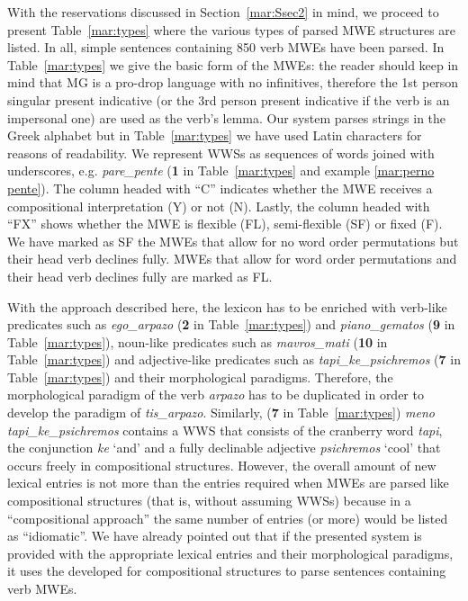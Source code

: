 \documentclass[output=paper]{langsci/langscibook}
\begin{document}
With the reservations discussed in Section~\ref{mar:Ssec2} in mind, we proceed to present Table~\ref{mar:types} where the various types of parsed MWE structures are listed. In all, simple sentences containing 850 verb MWEs have been parsed. In Table~\ref{mar:types} we give the basic form of the MWEs: the reader should keep in mind that MG is a pro-drop language with no infinitives, therefore the 1st person singular present indicative (or the 3rd person present indicative if the verb is an impersonal one) are used as the verb's lemma. Our system parses strings in the Greek alphabet but in Table~\ref{mar:types} we have used Latin characters for reasons of readability. We represent WWSs as sequences of words joined with underscores, e.g. \emph{pare\_pente} (\textbf{1} in Table~\ref{mar:types} and example \ref{mar:perno pente}). The column headed with ``C'' indicates whether the MWE receives a compositional interpretation (Y) or not (N). Lastly, the column headed with ``FX'' shows whether the MWE is flexible (FL), semi-flexible (SF) or fixed (F). We have marked as SF the MWEs that allow for no word order permutations but their head verb declines fully. MWEs that allow for word order permutations and their head verb declines fully are marked as FL.

With the approach described here, the lexicon has to be enriched with verb-like predicates such as \emph{ego\_arpazo} (\textbf{2} in Table~\ref{mar:types}) and \emph{piano\_gematos} (\textbf{9} in Table~\ref{mar:types}), noun-like predicates such as \emph{mavros\_mati} (\textbf{10} in Table~\ref{mar:types}) and adjective-like predicates such as \emph{tapi\_ke\_psichremos} (\textbf{7} in Table~\ref{mar:types}) and their morphological para\-digms. Therefore, the morphological paradigm of the verb \textit{arpazo} has to be duplicated in order to develop the paradigm of \emph{tis\_arpazo}. Similarly,  (\textbf{7} in Table~\ref{mar:types}) \emph{meno tapi\_ke\_psichremos} contains a WWS that consists of the cranberry word \textit{tapi}, the conjunction \textit{ke} `and' and a fully declinable adjective \textit{psichremos} `cool' that occurs freely in compositional structures. However, the overall amount of new lexical entries is not more than the entries required when MWEs are parsed like compositional structures (that is, without assuming WWSs) because in a ``compositional approach'' the same number of entries (or more) would be listed as ``idiomatic''. We have already pointed out that if the presented system is provided with the appropriate lexical entries and their morphological paradigms, it uses the  developed for compositional structures to parse sentences containing verb MWEs. 
\end{document}
